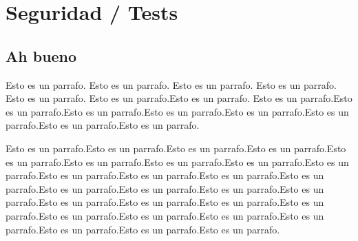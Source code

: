 \chapter{Seguridad / Tests}

\section{Ah bueno}

Esto es un parrafo. Esto es un parrafo. Esto es un parrafo. Esto es un parrafo. Esto es un parrafo. Esto es un parrafo.Esto es un parrafo. Esto es un parrafo.Esto es un parrafo.Esto es un parrafo.Esto es un parrafo.Esto es un parrafo.Esto es un parrafo.Esto es un parrafo.Esto es un parrafo.

Esto es un parrafo.Esto es un parrafo.Esto es un parrafo.Esto es un parrafo.Esto es un parrafo.Esto es un parrafo.Esto es un parrafo.Esto es un parrafo.Esto es un parrafo.Esto es un parrafo.Esto es un parrafo.Esto es un parrafo.Esto es un parrafo.Esto es un parrafo.Esto es un parrafo.Esto es un parrafo.Esto es un parrafo.Esto es un parrafo.Esto es un parrafo.Esto es un parrafo.Esto es un parrafo.Esto es un parrafo.Esto es un parrafo.Esto es un parrafo.Esto es un parrafo.Esto es un parrafo.Esto es un parrafo.Esto es un parrafo.